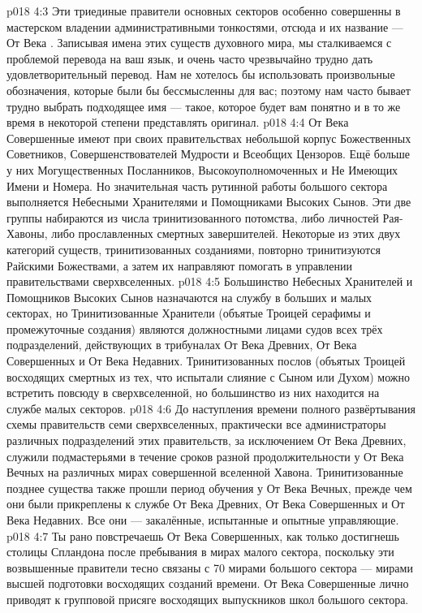 \vs p018 4:3 \pc Эти триединые правители основных секторов особенно совершенны в мастерском владении административными тонкостями, отсюда и их название --- От Века . Записывая имена этих существ духовного мира, мы сталкиваемся с проблемой перевода на ваш язык, и очень часто чрезвычайно трудно дать удовлетворительный перевод. Нам не хотелось бы использовать произвольные обозначения, которые были бы бессмысленны для вас; поэтому нам часто бывает трудно выбрать подходящее имя --- такое, которое будет вам понятно и в то же время в некоторой степени представлять оригинал.
\vs p018 4:4 \pc От Века Совершенные имеют при своих правительствах небольшой корпус Божественных Советников, Совершенствователей Мудрости и Всеобщих Цензоров. Ещё больше у них Могущественных Посланников, Высокоуполномоченных и Не Имеющих Имени и Номера. Но значительная часть рутинной работы большого сектора выполняется Небесными Хранителями и Помощниками Высоких Сынов. Эти две группы набираются из числа тринитизованного потомства, либо личностей Рая\hyp{}Хавоны, либо прославленных смертных завершителей. Некоторые из этих двух категорий существ, тринитизованных созданиями, повторно тринитизуются Райскими Божествами, а затем их направляют помогать в управлении правительствами сверхвселенных.
\vs p018 4:5 Большинство Небесных Хранителей и Помощников Высоких Сынов назначаются на службу в больших и малых секторах, но Тринитизованные Хранители (объятые Троицей серафимы и промежуточные создания) являются должностными лицами судов всех трёх подразделений, действующих в трибуналах От Века Древних, От Века Совершенных и От Века Недавних. Тринитизованных послов (объятых Троицей восходящих смертных из тех, что испытали слияние с Сыном или Духом) можно встретить повсюду в сверхвселенной, но большинство из них находится на службе малых секторов.
\vs p018 4:6 До наступления времени полного развёртывания схемы правительств семи сверхвселенных, практически все администраторы различных подразделений этих правительств, за исключением От Века Древних, служили подмастерьями в течение сроков разной продолжительности у От Века Вечных на различных мирах совершенной вселенной Хавона. Тринитизованные позднее существа также прошли период обучения у От Века Вечных, прежде чем они были прикреплены к службе От Века Древних, От Века Совершенных и От Века Недавних. Все они --- закалённые, испытанные и опытные управляющие.
\vs p018 4:7 \pc Ты рано повстречаешь От Века Совершенных, как только достигнешь столицы Спландона после пребывания в мирах малого сектора, поскольку эти возвышенные правители тесно связаны с 70 мирами большого сектора --- мирами высшей подготовки восходящих созданий времени. От Века Совершенные лично приводят к групповой присяге восходящих выпускников школ большого сектора.
